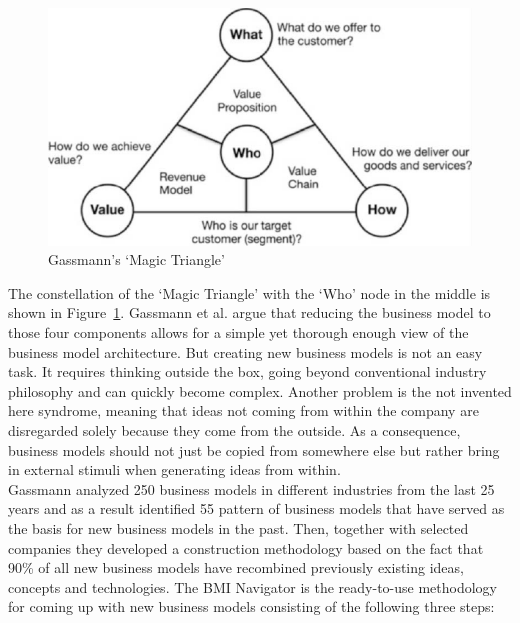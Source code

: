 		\begin{figure}[ht]
		    \begin{center}
		    \includegraphics[scale=1.0]{Talk11/gassmann_triangle.pdf}
		    \end{center}
		    \caption{Gassmann's `Magic Triangle' \cite{gassmann55}}
		    \label{fig:m_triangle}
		\end{figure}
		The constellation of the `Magic Triangle' with the `Who' node in the middle is shown in Figure~\ref{fig:m_triangle}. Gassmann et al. argue that reducing the business model to those four components allows for a simple yet thorough enough view of the business model architecture. But creating new business models is not an easy task. It requires thinking outside the box, going beyond conventional industry philosophy and can quickly become complex. Another problem is the not invented here syndrome, meaning that ideas not coming from within the company are disregarded solely because they come from the outside. As a consequence, business models should not just be copied from somewhere else but rather bring in external stimuli when generating ideas from within.\\
		Gassmann analyzed 250 business models in different industries from the last 25 years and as a result identified 55 pattern of business models that have served as the basis for new business models in the past. Then, together with selected companies they developed a construction methodology based on the fact that 90\% of all new business models have recombined previously existing ideas, concepts and  technologies. The BMI Navigator is the ready-to-use methodology for coming up with new business models consisting of the following three steps:
		\vspace{-1em}
